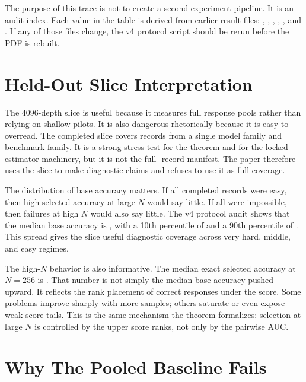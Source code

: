 The purpose of this trace is not to create a second experiment pipeline. It is
an audit index. Each value in the table is derived from earlier result files:
,
,
,
,
, and
. If any of those files change,
the v4 protocol script should be rerun before the PDF is rebuilt.

\section{Held-Out Slice Interpretation}
\label{app:heldout-interpretation}

The 4096-depth slice is useful because it measures full response pools rather
than relying on shallow pilots. It is also dangerous rhetorically because it is
easy to overread. The completed slice covers \EvidenceHeldoutRecords{} records
from a single model family and benchmark family. It is a strong stress test for
the theorem and for the locked estimator machinery, but it is not the full
\EvidenceHeldoutRequiredRecords{}-record manifest. The paper therefore uses the
slice to make diagnostic claims and refuses to use it as full coverage.

The distribution of base accuracy matters. If all completed records were easy,
then high selected accuracy at large $N$ would say little. If all were
impossible, then failures at high $N$ would also say little. The v4 protocol audit shows
that the median base accuracy is \EvidenceHeldoutPMedian{}, with a 10th
percentile of \EvidenceHeldoutPQTen{} and a 90th percentile of
\EvidenceHeldoutPQNinety{}. This spread gives the slice useful diagnostic
coverage across very hard, middle, and easy regimes.

The high-$N$ behavior is also informative. The median exact selected accuracy
at $N=256$ is \EvidenceHeldoutFTwoFiveSixMedian{}. That number is not simply the median
base accuracy pushed upward. It reflects the rank placement of correct
responses under the score. Some problems improve sharply with more samples;
others saturate or even expose weak score tails. This is the same mechanism
the theorem formalizes: selection at large $N$ is controlled by the upper
score ranks, not only by the pairwise AUC.

\section{Why The Pooled Baseline Fails}
\label{app:pooled}

